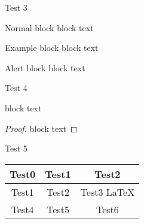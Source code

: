 \documentclass{beamer}
\begin{document}
        \begin{frame}{Test 3}
            \begin{block}{Normal block}
            block text
            \end{block}
            
            \begin{exampleblock}{Example block}
            block text
            \end{exampleblock}
            
            
            \begin{alertblock}{Alert block}
            block text
            \end{alertblock}
        \end{frame}

        \begin{frame}{Test 4}
            \begin{theorem}
            block text
            \end{theorem}
            
            \begin{proof}
            block text
            \end{proof}

        \end{frame}


        \begin{frame}{Test 5}

            \begin{tabular}{|c|c|c|}
            \hline
            \textbf{Test0} & \textbf{Test1} & \textbf{Test2} \\
            \hline
            Test1 & Test2 & Test3 \LaTeX  \\
            \hline
            Test4 & Test5& Test6\\
            \hline
            \end{tabular}
            
        \end{frame}
\end{document}

